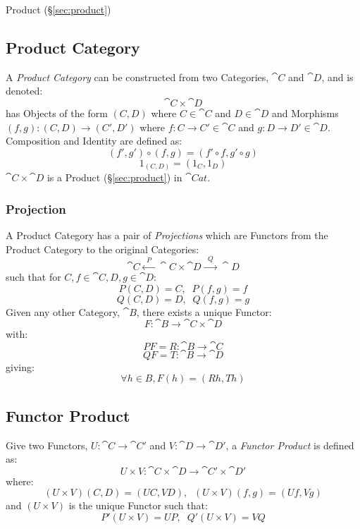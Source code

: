 Product (\S\ref{sec:product})



\subsection{Product Category}\label{sec:product_category}

A \emph{Product Category} can be constructed from two Categories,
$\cat{C}$ and $\cat{D}$, and is denoted:
\[
  \cat{C} \times \cat{D}
\]
has Objects of the form $(C,D)$ where $C \in \cat{C}$ and $D \in
\cat{D}$ and Morphisms $(f,g) : (C,D) \rightarrow (C',D')$ where $f
: C \rightarrow C' \in \cat{C}$ and $g : D \rightarrow D' \in
\cat{D}$. Composition and Identity are defined as:
\[
  (f',g') \circ (f,g) = (f' \circ f,g' \circ g)
\]\[
  1_{(C,D)} = (1_C, 1_D)
\]
$\cat{C} \times \cat{D}$ is a Product (\S\ref{sec:product}) in
$\cat{Cat}$.



\subsubsection{Projection}\label{sec:projection_functor}

A Product Category has a pair of \emph{Projections} which are Functors
from the Product Category to the original Categories:
\[
  \cat{C} \xleftarrow{\;\; P\;\;} \cat{C}\times\cat{D}
  \xrightarrow{\;\; Q\;\;} \cat{D}
\]
such that for $C,f \in \cat{C}, D,g \in \cat{D}$:
\[
  P(C,D) = C, \;\; P(f,g) = f
\]\[
  Q(C,D) = D, \;\; Q(f,g) = g
\]
Given any other Category, $\cat{B}$, there exists a unique Functor:
\[
  F : \cat{B} \rightarrow \cat{C} \times \cat{D}
\]
with:
\[
  PF = R : \cat{B} \rightarrow \cat{C}
\]\[
  QF = T : \cat{B} \rightarrow \cat{D}
\]
giving:
\[
  \forall h \in B, F(h) = (Rh,Th)
\]



\subsection{Functor Product}\label{sec:functor_product}

Give two Functors, $U : \cat{C} \rightarrow \cat{C'}$ and $V :
\cat{D} \rightarrow \cat{D'}$, a \emph{Functor Product} is
defined as:
\[
  U \times V : \cat{C} \times \cat{D}
  \rightarrow \cat{C'} \times \cat{D'}
\]
where:
\[
  (U \times V)(C,D) = (UC,VD), \;\; (U \times V)(f,g) = (Uf,Vg)
\]
and $(U \times V)$ is the unique Functor such that:
\[
  P'(U \times V) = UP, \;\; Q'(U \times V) = VQ
\]



